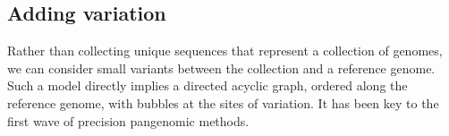 
\subsection{Adding variation}

Rather than collecting unique sequences that represent a collection of genomes, we can consider small variants between the collection and a reference genome.
Such a model directly implies a directed acyclic graph, ordered along the reference genome, with bubbles at the sites of variation.
It has been key to the first wave of precision pangenomic methods.

